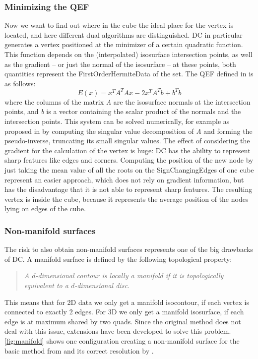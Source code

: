 \subsubsection{Minimizing the \acl{QEF}}
Now we want to find out where in the cube the ideal place for the vertex is located, and here different dual algorithms are distinguished. \Ac{DC} in particular generates a vertex positioned at the minimizer of a certain quadratic function. This function depends on the (interpolated) isosurface intersection points, as well as the gradient -- or just the normal of the isosurface -- at these points, both quantities represent the \acs{FirstOrderHermiteData} of the set.
The \acl{QEF} defined in \cite{Hermite2002} is as follows:
\begin{equation}
\label{eq:QEF}
E(x)= x^TA^TAx-2x^TA^Tb+b^Tb
\end{equation}
where the columns of the matrix \textit{A} are the  isosurface normals at the intersection points, and \textit{b} is a vector containing the scalar product of the normals and the intersection points. This system can be solved numerically, for example as proposed in \cite{Hermite2002} by computing the singular value decomposition of \textit{A} and forming the pseudo-inverse, truncating its small singular values. 
The effect of considering the gradient for the calculation of the vertex is huge: \ac{DC} has the ability to represent sharp features like edges and corners.
Computing the position of the new node by just taking the mean value of all the roots on the \acsp{SignChangingEdge} of one cube represent an easier approach, which does not rely on gradient information, but has the disadvantage that it is not able to represent sharp features. The resulting vertex is inside the cube, because it represents the average position of the nodes lying on edges of the cube.

\subsubsection{Non-manifold surfaces}
The risk to also obtain non-manifold surfaces represents one of the big drawbacks of \ac{DC}. A manifold surface is defined by the following topological property:
\begin{quote}
\emph{A $d$-dimensional contour is locally a \emph{manifold} if it is topologically equivalent to a $d$-dimensional disc.}\cite{Hermite2002}
\end{quote}
This means that for 2D data we only get a manifold isocontour, if each vertex is connected to exactly 2 edges. For 3D we only get a manifold isosurface, if each edge is at maximum shared by two \acp{quad}. Since the original method does not deal with this issue, extensions have been developed to solve this problem. \autoref{fig:manifold} shows one configuration creating a non-manifold surface for the basic method from \cite{Hermite2002} and its correct resolution by \cite{Schaefer2007}.

